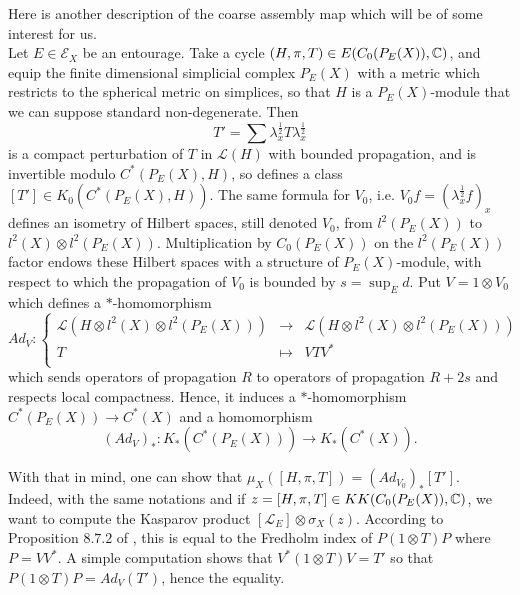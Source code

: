 Here is another description of the coarse assembly map which will be of some interest for us.\\

Let $E\in \mathcal E_X$ be an entourage. Take a cycle $(H,\pi, T)\in E(C_0(P_E(X)), \mathbb C)$, and equip the finite dimensional simplicial complex $P_E(X)$ with a metric which restricts to the spherical metric on simplices, so that $H$ is a $P_E(X)$-module that we can suppose standard non-degenerate. Then 
\[T'=\sum \lambda_x^{\frac{1}{2}} T \lambda_x^{\frac{1}{2}} \] 
is a compact perturbation of $T$ in $\mathcal L(H)$ with bounded propagation, and is invertible modulo $C^*(P_E(X),H)$, so defines a class $[T']\in K_0(C^*(P_E(X),H))$. 
The same formula for $V_0$, i.e. $V_0f = (\lambda_x^{\frac{1}{2}}f)_{x}$ defines an isometry of Hilbert spaces, still denoted $V_0$, from $l^2(P_E(X))$ to $l^2(X)\otimes l^2(P_E(X))$. Multiplication by $C_0(P_E(X))$ on the $l^2(P_E(X))$ factor endows these Hilbert spaces with a structure of $P_E(X)$-module, with respect to which the propagation of $V_0$ is bounded by $s = \sup_E d$. Put $V = 1\otimes V_0 $ which defines a $*$-homomorphism
\[Ad_{V} :\left\{\begin{array}{rcl} 
\mathcal L(H\otimes l^2(X)\otimes l^2(P_E(X)) ) & \rightarrow & \mathcal L(H\otimes l^2(X)\otimes l^2(P_E(X)) ) \\
T &\mapsto & VTV^* \\
\end{array}\right.\]
which sends operators of propagation $R$ to operators of propagation $R+2s$ and respects local compactness. Hence, it induces a $*$-homomorphism $C^*(P_E(X))\rightarrow C^*(X)$ and a homomorphism
\[(Ad_{V})_* : K_*(C^*(P_E(X)))\rightarrow K_*(C^*(X)).\]

With that in mind, one can show that $\mu_{X}([H,\pi,T])=(Ad_{V_0})_*[T']$.\\

Indeed, with the same notations and if $z=[H,\pi,T]\in KK(C_0(P_E(X)),\mathbb C)$, we want to compute the Kasparov product $[\mathcal L_E]\otimes \sigma_X(z)$. According to Proposition $8.7.2$ of \cite{HigsonRoe}, this is equal to the Fredholm index of $P(1\otimes T)P$ where $P=VV^*$. A simple computation shows that $V^*(1\otimes T)V=T'$ so that $P(1\otimes T)P = Ad_V(T')$, hence the equality.\\

